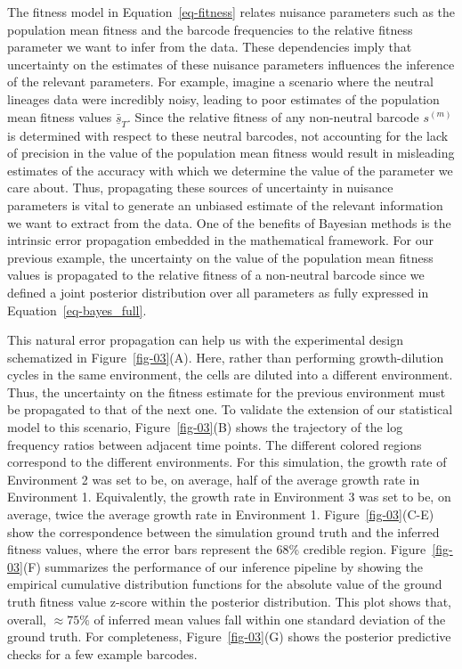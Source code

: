 \documentclass[
]{scrartcl}
\begin{document}
\begin{refsegment}
The fitness model in Equation~\ref{eq-fitness} relates nuisance
parameters such as the population mean fitness and the barcode
frequencies to the relative fitness parameter we want to infer from the
data. These dependencies imply that uncertainty on the estimates of
these nuisance parameters influences the inference of the relevant
parameters. For example, imagine a scenario where the neutral lineages
data were incredibly noisy, leading to poor estimates of the population
mean fitness values \(\underline{\bar{s}}_T\). Since the relative
fitness of any non-neutral barcode \(s^{(m)}\) is determined with
respect to these neutral barcodes, not accounting for the lack of
precision in the value of the population mean fitness would result in
misleading estimates of the accuracy with which we determine the value
of the parameter we care about. Thus, propagating these sources of
uncertainty in nuisance parameters is vital to generate an unbiased
estimate of the relevant information we want to extract from the data.
One of the benefits of Bayesian methods is the intrinsic error
propagation embedded in the mathematical framework. For our previous
example, the uncertainty on the value of the population mean fitness
values is propagated to the relative fitness of a non-neutral barcode
since we defined a joint posterior distribution over all parameters as
fully expressed in Equation~\ref{eq-bayes_full}.

This natural error propagation can help us with the experimental design
schematized in Figure~\ref{fig-03}(A). Here, rather than performing
growth-dilution cycles in the same environment, the cells are diluted
into a different environment. Thus, the uncertainty on the fitness
estimate for the previous environment must be propagated to that of the
next one. To validate the extension of our statistical model to this
scenario, Figure~\ref{fig-03}(B) shows the trajectory of the log
frequency ratios between adjacent time points. The different colored
regions correspond to the different environments. For this simulation,
the growth rate of Environment 2 was set to be, on average, half of the
average growth rate in Environment 1. Equivalently, the growth rate in
Environment 3 was set to be, on average, twice the average growth rate
in Environment 1. Figure~\ref{fig-03}(C-E) show the correspondence
between the simulation ground truth and the inferred fitness values,
where the error bars represent the 68\% credible region.
Figure~\ref{fig-03}(F) summarizes the performance of our inference
pipeline by showing the empirical cumulative distribution functions for
the absolute value of the ground truth fitness value z-score within the
posterior distribution. This plot shows that, overall, \(\approx 75\%\)
of inferred mean values fall within one standard deviation of the ground
truth. For completeness, Figure~\ref{fig-03}(G) shows the posterior
predictive checks for a few example barcodes.


\end{refsegment}
\end{document}
